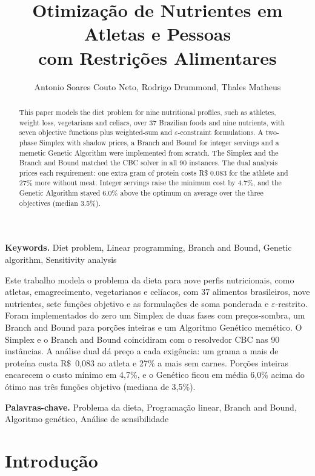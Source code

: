 \documentclass[12pt]{article}
\title{Otimização de Nutrientes em Atletas e Pessoas\\com Restrições Alimentares}
\author{Antonio Soares Couto Neto\inst{1}, Rodrigo Drummond\inst{1}, Thales Matheus\inst{1}}
\begin{document}
\maketitle

\begin{abstract}
This paper models the diet problem for nine nutritional profiles, such as athletes,
weight loss, vegetarians and celiacs, over 37 Brazilian foods and nine nutrients, with
seven objective functions plus weighted-sum and $\varepsilon$-constraint formulations.
A two-phase Simplex with shadow prices, a Branch and Bound for integer servings and a
memetic Genetic Algorithm were implemented from scratch. The Simplex and the Branch and
Bound matched the CBC solver in all 90 instances. The dual analysis prices each
requirement: one extra gram of protein costs R\$ 0.083 for the athlete and
27\% more without meat. Integer servings raise the minimum cost by
4.7\%, and the Genetic Algorithm stayed 6.0\% above the optimum on average over the
three objectives (median 3.5\%).
\end{abstract}

\noindent\textbf{Keywords.} Diet problem, Linear programming, Branch and Bound, Genetic
algorithm, Sensitivity analysis

\begin{resumo}
Este trabalho modela o problema da dieta para nove perfis nutricionais, como atletas,
emagrecimento, vegetarianos e celíacos, com 37 alimentos brasileiros, nove nutrientes,
sete funções objetivo e as formulações de soma ponderada e $\varepsilon$-restrito.
Foram implementados do zero um Simplex de duas fases com preços-sombra, um Branch and
Bound para porções inteiras e um Algoritmo Genético memético. O Simplex e o Branch and
Bound coincidiram com o resolvedor CBC nas 90 instâncias. A análise dual dá preço a cada
exigência: um grama a mais de proteína custa R\$~0{,}083 ao atleta e
27\% a mais sem carnes. Porções inteiras encarecem o custo mínimo em
4{,}7\%, e o Genético ficou em média 6{,}0\% acima do ótimo nas três funções objetivo
(mediana de 3{,}5\%).
\end{resumo}

\noindent\textbf{Palavras-chave.} Problema da dieta, Programação linear, Branch and
Bound, Algoritmo genético, Análise de sensibilidade

\section{Introdução}
\end{document}
